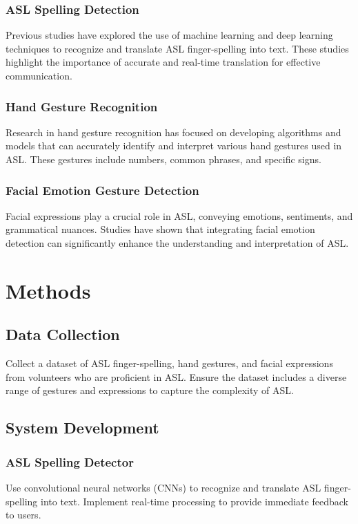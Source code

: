 \documentclass{article}
\begin{document}
\subsubsection{ASL Spelling Detection}
Previous studies have explored the use of machine learning and deep learning techniques to recognize and translate ASL finger-spelling into text. These studies highlight the importance of accurate and real-time translation for effective communication.

\subsubsection{Hand Gesture Recognition}
Research in hand gesture recognition has focused on developing algorithms and models that can accurately identify and interpret various hand gestures used in ASL. These gestures include numbers, common phrases, and specific signs.

\subsubsection{Facial Emotion Gesture Detection}
Facial expressions play a crucial role in ASL, conveying emotions, sentiments, and grammatical nuances. Studies have shown that integrating facial emotion detection can significantly enhance the understanding and interpretation of ASL.
\section{Methods}
\subsection{Data Collection}
Collect a dataset of ASL finger-spelling, hand gestures, and facial expressions from volunteers who are proficient in ASL. Ensure the dataset includes a diverse range of gestures and expressions to capture the complexity of ASL.

\subsection{System Development}
\subsubsection{ASL Spelling Detector}
Use convolutional neural networks (CNNs) to recognize and translate ASL finger-spelling into text. Implement real-time processing to provide immediate feedback to users.
\end{document}

